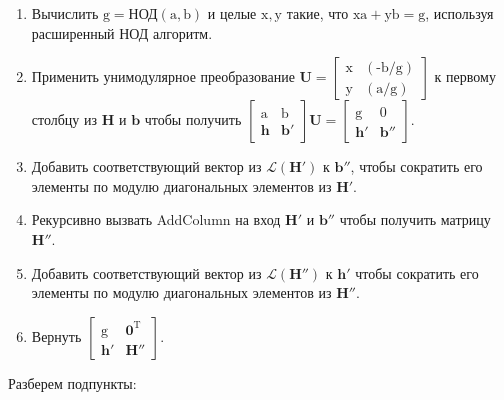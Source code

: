 \begin{enumerate}
\item Вычислить $ \mathrm{g}=\text{НОД}⁡(\mathrm{a, b}) $ и целые $ \mathrm{x, y} $ такие, что $ \mathrm{xa+yb=g} $, используя расширенный НОД алгоритм.
\item Применить унимодулярное преобразование 
$ \mathbf{U}=\left[ \begin{array}{cccc}
\mathrm{x} & \mathrm{(\text{-}b/g)} \\ 
\mathrm{y} & \mathrm{(a/g)} \end{array} \right] $ к первому столбцу из $ \mathbf{H} $ и $ \mathbf{b} $ чтобы получить 
$ \left[ \begin{array}{cccc}
\mathrm{a} & \mathrm{b} \\
\mathbf{h} & \mathbf{b}' \end{array} \right] \mathbf{U}=
\left[ \begin{array}{cccc}
\mathrm{g} & \mathrm{0} \\
\mathbf{h}' & \mathbf{b}'' \end{array} \right] $.
\item Добавить соответствующий вектор из $ \mathcal{L}\left(\mathbf{H}'\right) $ к $ \mathbf{b}'' $, чтобы сократить его элементы по модулю диагональных элементов из $ \mathbf{H}' $.
\item Рекурсивно вызвать AddColumn на вход $ \mathbf{H}' $ и $ \mathbf{b}'' $ чтобы получить матрицу $ \mathbf{H}'' $.
\item Добавить соответствующий вектор из $ \mathcal{L}\left(\mathbf{H}''\right) $ к $ \mathbf{h}' $ чтобы сократить его элементы по модулю диагональных элементов из $ \mathbf{H}'' $.
\item Вернуть $ \left[\begin{array}{cccc}
\mathrm{g} & \mathbf{0}^\mathrm{T} \\
\mathbf{h}' & \mathbf{H}'' 
\end{array}\right] $.

\end{enumerate}

Разберем подпункты:

